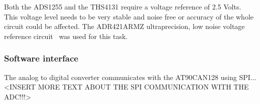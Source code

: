 Both the ADS1255 and the THS4131 require a voltage reference of 2.5 Volts. This voltage level needs to be very stable and noise free or accuracy of the whole circuit could be affected. The ADR421ARMZ ultraprecision, low noise voltage reference circuit~\cite{web:adr421} was used for this task.

\subsubsection{Software interface}
The analog to digital converter communicates with the \newline
AT90CAN128 using SPI...  <INSERT MORE TEXT ABOUT THE SPI COMMUNICATION WITH THE ADC!!!>







\newpage
